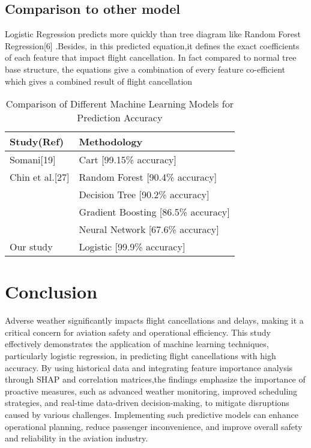\documentclass[conference]{IEEEtran}
\begin{document}
\subsection{Comparison to other model}\label{subsec5}
\noindent Logistic Regression predicts more quickly than tree diagram like Random Forest Regression[6] .Besides, in this predicted equation,it defines the exact coefficients of each feature that impact flight cancellation. In fact compared to normal tree base structure, the equations give a combination of every feature co-efficient which gives a combined result of flight cancellation 
\begin{table}[!ht]
    \centering
    \caption{Comparison of Different Machine Learning Models for Prediction Accuracy}
    \label{tab:model_comparison} %
    \begin{tabular}{|l|l|}
    \hline
        Study(Ref) & Methodology \\ \hline
        Somani[19] & Cart [99.15\% accuracy] \\ \hline
        Chin et al.[27] & Random Forest [90.4\% accuracy] \\ \hline
        ~ & Decision Tree [90.2\% accuracy] \\ \hline
        ~ & Gradient Boosting [86.5\% accuracy] \\ \hline
        ~ & Neural Network [67.6\% accuracy] \\ \hline
        Our study & Logistic [99.9\% accuracy] \\ \hline
    \end{tabular}
\end{table}


\section{Conclusion}\label{sec7}
\noindent Adverse weather significantly impacts flight cancellations and delays, making it a critical concern for aviation safety and operational efficiency. This study effectively demonstrates the application of machine learning techniques, particularly logistic regression, in predicting flight cancellations with high accuracy. By using historical data and integrating feature importance analysis through SHAP and correlation matrices,the findings emphasize the importance of proactive measures, such as advanced weather monitoring, improved scheduling strategies, and real-time data-driven decision-making, to mitigate disruptions caused by  various challenges. Implementing such predictive models can enhance operational planning, reduce passenger inconvenience, and improve overall safety and reliability in the aviation industry.
\end{document}
